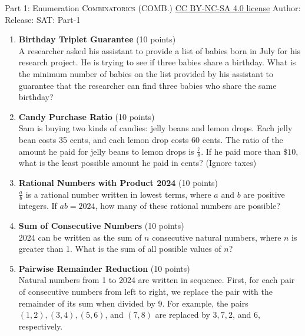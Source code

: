 \newpage\handout
{Part 1: Enumeration}
{\textsc{Combinatorics (COMB.)}}
{\href{https://creativecommons.org/licenses/by-nc-sa/4.0/}{CC BY-NC-SA 4.0 license}}
{Author: \BookAuthor}{Release: \generatedOn}
{SAT: Part-1}


\begin{enumerate}
  \item \textbf{Birthday Triplet Guarantee} (10 points)\\
  A researcher asked his assistant to provide a list of babies born in July for his research project. He is trying to see if three babies share a birthday. What is the minimum number of babies on the list provided by his assistant to guarantee that the researcher can find three babies who share the same birthday?
  \begin{subanswer}
  \end{subanswer}

  \item \textbf{Candy Purchase Ratio} (10 points)\\
  Sam is buying two kinds of candies: jelly beans and lemon drops. Each jelly bean costs 35 cents, and each lemon drop costs 60 cents. The ratio of the amount he paid for jelly beans to lemon drops is $\frac{7}{8}$. If he paid more than $\$10$, what is the least possible amount he paid in cents? (Ignore taxes)
  \begin{subanswer}
  \end{subanswer}

  \item \textbf{Rational Numbers with Product 2024} (10 points)\\
  $\frac{a}{b}$ is a rational number written in lowest terms, where $a$ and $b$ are positive integers. If $ab=2024$, how many of these rational numbers are possible?
  \begin{subanswer}
  \end{subanswer}

  \item \textbf{Sum of Consecutive Numbers} (10 points)\\
  2024 can be written as the sum of $n$ consecutive natural numbers, where $n$ is greater than 1. What is the sum of all possible values of $n$?
  \begin{subanswer}
  \end{subanswer}

  \item \textbf{Pairwise Remainder Reduction} (10 points)\\
  Natural numbers from 1 to 2024 are written in sequence. First, for each pair of consecutive numbers from left to right, we replace the pair with the remainder of its sum when divided by 9. For example, the pairs $(1,2),(3,4),(5,6)$, and $(7,8)$ are replaced by $3,7,2$, and $6$, respectively.


\end{enumerate}
